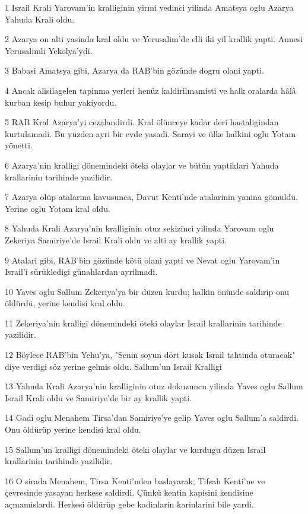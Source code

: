 \par 1 Israil Krali Yarovam'in kralliginin yirmi yedinci yilinda Amatsya oglu Azarya Yahuda Krali oldu.
\par 2 Azarya on alti yasinda kral oldu ve Yerusalim'de elli iki yil krallik yapti. Annesi Yerusalimli Yekolya'ydi.
\par 3 Babasi Amatsya gibi, Azarya da RAB'bin gözünde dogru olani yapti.
\par 4 Ancak alisilagelen tapinma yerleri henüz kaldirilmamisti ve halk oralarda hâlâ kurban kesip buhur yakiyordu.
\par 5 RAB Kral Azarya'yi cezalandirdi. Kral ölünceye kadar deri hastaligindan kurtulamadi. Bu yüzden ayri bir evde yasadi. Sarayi ve ülke halkini oglu Yotam yönetti.
\par 6 Azarya'nin kralligi dönemindeki öteki olaylar ve bütün yaptiklari Yahuda krallarinin tarihinde yazilidir.
\par 7 Azarya ölüp atalarina kavusunca, Davut Kenti'nde atalarinin yanina gömüldü. Yerine oglu Yotam kral oldu.
\par 8 Yahuda Krali Azarya'nin kralliginin otuz sekizinci yilinda Yarovam oglu Zekeriya Samiriye'de Israil Krali oldu ve alti ay krallik yapti.
\par 9 Atalari gibi, RAB'bin gözünde kötü olani yapti ve Nevat oglu Yarovam'in Israil'i sürükledigi günahlardan ayrilmadi.
\par 10 Yaves oglu Sallum Zekeriya'ya bir düzen kurdu; halkin önünde saldirip onu öldürdü, yerine kendisi kral oldu.
\par 11 Zekeriya'nin kralligi dönemindeki öteki olaylar Israil krallarinin tarihinde yazilidir.
\par 12 Böylece RAB'bin Yehu'ya, "Senin soyun dört kusak Israil tahtinda oturacak" diye verdigi söz yerine gelmis oldu. Sallum'un Israil Kralligi
\par 13 Yahuda Krali Azarya'nin kralliginin otuz dokuzuncu yilinda Yaves oglu Sallum Israil Krali oldu ve Samiriye'de bir ay krallik yapti.
\par 14 Gadi oglu Menahem Tirsa'dan Samiriye'ye gelip Yaves oglu Sallum'a saldirdi. Onu öldürüp yerine kendisi kral oldu.
\par 15 Sallum'un kralligi dönemindeki öteki olaylar ve kurdugu düzen Israil krallarinin tarihinde yazilidir.
\par 16 O sirada Menahem, Tirsa Kenti'nden baslayarak, Tifsah Kenti'ne ve çevresinde yasayan herkese saldirdi. Çünkü kentin kapisini kendisine açmamislardi. Herkesi öldürüp gebe kadinlarin karinlarini bile yardi.
